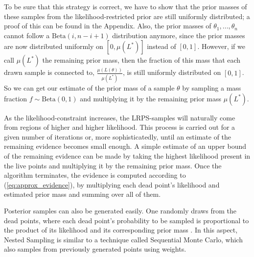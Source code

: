 \documentclass[12pt, a4paper]{report}
\begin{document}
To be sure that this strategy is correct, we have to show that the prior masses of these samples from the likelihood-restricted prior are still uniformly distributed; a proof of this can be found in the Appendix.
Also, the prior masses of $\theta_1, ..., \theta_n$ cannot follow a $\textrm{Beta}(i, n-i+1)$ distribution anymore, since the prior masses are now distributed uniformly on $[0,\mu(L^*)]$ instead of $[0,1]$.
However, if we call $\mu(L^*)$ the remaining prior mass, then the fraction of this mass that each drawn sample is connected to, $\frac{\mu(L(\theta))}{\mu(L^*)}$, is still uniformly distributed on $[0,1]$.
So we can get our estimate of the prior mass of a sample $\theta$ by sampling a mass fraction $f \sim \textrm{Beta}(0,1)$ and multiplying it by the remaining prior mass $\mu(L^*)$.

As the likelihood-constraint increases, the LRPS-samples will naturally come from regions of higher and higher likelihood.
This process is carried out for a given number of iterations or, more sophisticatedly, until an estimate of the remaining evidence becomes small enough.
A simple estimate of an upper bound of the remaining evidence can be made by taking the highest likelihood present in the live points and multiplying it by the remaining prior mass.
Once the algorithm terminates, the evidence is computed according to (\ref{eq:approx_evidence}), by multiplying each dead point's likelihood and estimated prior mass and summing over all of them.

Posterior samples can also be generated easily.
One randomly draws from the dead points, where each dead point's probability to be sampled is proportional to the product of its likelihood and its corresponding prior mass \cite[9]{nested_sampling_talk}.
In this aspect, Nested Sampling is similar to a technique called Sequential Monte Carlo, which also samples from previously generated points using weights.
\end{document}
